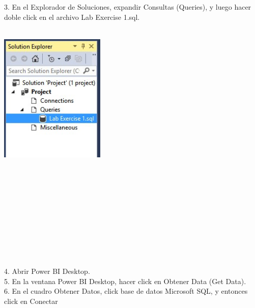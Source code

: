 \begin{flushleft}
\begin{itemize}
3. En el Explorador de Soluciones, expandir Consultas (Queries), y luego hacer doble click en el archivo Lab
Exercise 1.sql.\\
\textbf{ }\\
\begin{center}
	\includegraphics[width=5cm]{./Imagenes/image2} 
	\end{center}
\textbf{ }\\
\textbf{ }\\
\textbf{ }\\
\textbf{ }\\
\textbf{ }\\
\textbf{ }\\
\textbf{ }\\
\textbf{ }\\
\textbf{ }\\
\textbf{ }\\
4. Abrir Power BI Desktop.\\
5. En la ventana Power BI Desktop, hacer click en Obtener Data (Get Data).\\
6. En el cuadro Obtener Datos, click base de datos Microsoft SQL, y entonces click en Conectar\\


\end{itemize}
\end{flushleft}
